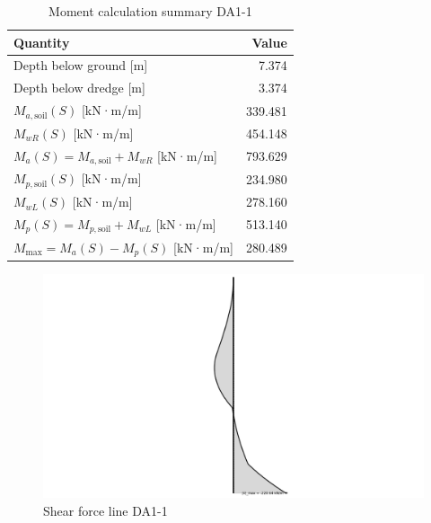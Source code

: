\begin{table}[H]
  \centering
  \caption{Moment calculation summary DA1-1}
  \label{tab:moment_summary}
  \small
  \setlength{\tabcolsep}{8pt}
  \renewcommand{\arraystretch}{1.15}
  \begin{tabular}{@{}l r@{}}
    \toprule
    Quantity & Value \\
    \midrule
    Depth below ground [m] & 7.374 \\
    Depth below dredge [m] & 3.374 \\
    $M_{a,\text{soil}}(S)$ [kN·m/m] & 339.481 \\
    $M_{wR}(S)$ [kN·m/m] & 454.148 \\
    $M_{a}(S) = M_{a,\text{soil}} + M_{wR}$ [kN·m/m] & 793.629 \\
    $M_{p,\text{soil}}(S)$ [kN·m/m] & 234.980 \\
    $M_{wL}(S)$ [kN·m/m] & 278.160 \\
    $M_{p}(S) = M_{p,\text{soil}} + M_{wL}$ [kN·m/m] & 513.140 \\
    $M_{\text{max}} = M_{a}(S) - M_{p}(S)$ [kN·m/m] & 280.489 \\
    \bottomrule
  \end{tabular}
\end{table}

\begin{figure}[H]
    \centering
    \includegraphics[width=0.80\linewidth]{figures/appendix-i/shear_line_7575.png}
    \caption{Shear force line DA1-1}
    \label{fig:appendix_shear_forces_DA1_1}
\end{figure}

